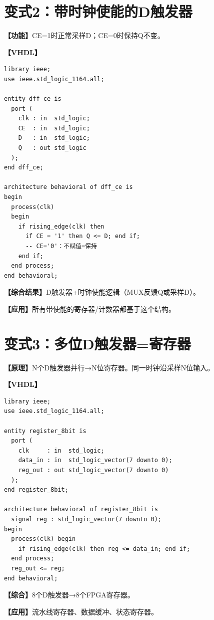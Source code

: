 \section{变式2：带时钟使能的D触发器}

\begin{detailbox}[完整教学]
\textbf{【功能】}CE=1时正常采样D；CE=0时保持Q不变。

\textbf{【VHDL】}
\begin{lstlisting}[caption={带时钟使能的D触发器}]
library ieee;
use ieee.std_logic_1164.all;

entity dff_ce is
  port (
    clk : in  std_logic;
    CE  : in  std_logic;
    D   : in  std_logic;
    Q   : out std_logic
  );
end dff_ce;

architecture behavioral of dff_ce is
begin
  process(clk)
  begin
    if rising_edge(clk) then
      if CE = '1' then Q <= D; end if;
      -- CE='0'：不赋值=保持
    end if;
  end process;
end behavioral;
\end{lstlisting}

\textbf{【综合结果】}D触发器+时钟使能逻辑（MUX反馈Q或采样D）。

\textbf{【应用】}所有带使能的寄存器/计数器都基于这个结构。
\end{detailbox}


\section{变式3：多位D触发器=寄存器}

\begin{detailbox}[完整教学]
\textbf{【原理】}N个D触发器并行→N位寄存器。同一时钟沿采样N位输入。

\textbf{【VHDL】}
\begin{lstlisting}[caption={8位寄存器（多位D触发器）}]
library ieee;
use ieee.std_logic_1164.all;

entity register_8bit is
  port (
    clk     : in  std_logic;
    data_in : in  std_logic_vector(7 downto 0);
    reg_out : out std_logic_vector(7 downto 0)
  );
end register_8bit;

architecture behavioral of register_8bit is
  signal reg : std_logic_vector(7 downto 0);
begin
  process(clk) begin
    if rising_edge(clk) then reg <= data_in; end if;
  end process;
  reg_out <= reg;
end behavioral;
\end{lstlisting}

\textbf{【综合】}8个D触发器→8个FPGA寄存器。

\textbf{【应用】}流水线寄存器、数据缓冲、状态寄存器。
\end{detailbox}


